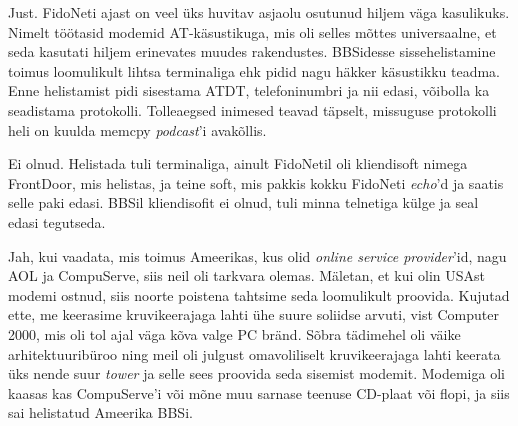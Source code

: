 
Just. FidoNeti ajast on veel üks huvitav asjaolu osutunud 
hiljem väga kasulikuks. Nimelt töötasid modemid
AT-käsustikuga, mis 
oli selles mõttes universaalne, et seda kasutati hiljem 
erinevates muudes rakendustes. BBSidesse sissehelistamine toimus loomulikult
lihtsa terminaliga ehk pidid nagu häkker käsustikku teadma. Enne 
helistamist pidi sisestama ATDT, telefoninumbri ja nii edasi, võibolla ka
seadistama protokolli. Tolleaegsed inimesed teavad täpselt, 
missuguse protokolli heli on kuulda memcpy \emph{podcast}'i avakõllis. 


Ei olnud. Helistada tuli terminaliga, ainult FidoNetil oli kliendisoft 
nimega FrontDoor, mis helistas, ja teine soft, mis pakkis kokku FidoNeti 
\emph{echo}'d ja saatis selle paki edasi. BBSil kliendisofit ei olnud, tuli minna telnetiga külge ja seal 
edasi tegutseda.


Jah, kui vaadata, mis toimus Ameerikas, kus olid 
\emph{online service provider}'id, nagu AOL ja 
CompuServe, siis neil oli tarkvara olemas. Mäletan, et 
kui olin USAst modemi ostnud, siis noorte poistena tahtsime seda loomulikult 
proovida. Kujutad ette, me keerasime kruvikeerajaga lahti 
ühe suure soliidse arvuti, vist Computer 2000, mis oli 
tol ajal väga kõva valge PC bränd. Sõbra tädimehel oli 
väike arhitektuuribüroo ning meil oli julgust 
omavoliliselt kruvikeerajaga lahti keerata üks nende suur \emph{tower} ja 
selle sees proovida seda sisemist modemit. Modemiga oli kaasas kas 
CompuServe'i või mõne muu sarnase teenuse CD-plaat või flopi, ja siis sai helistatud Ameerika BBSi. 

